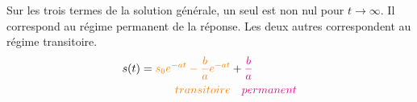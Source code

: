 Sur les trois termes de la solution générale, un seul est non                                                                             
nul pour $t\to\infty$. Il correspond au régime permanent de                                                                               
la réponse. Les deux autres correspondent au régime transitoire.                                                                          
\begin{align*}                                                                                                                            
    s(t)=\textcolor{orange}{s_0e^{-at}-\dfrac{b}{a}e^{-at}}&+\textcolor{magenta}{\dfrac{b}{a}}\\                                          
    \textcolor{orange}{transitoire} &\quad\textcolor{magenta}{permanent}                                                                  
\end{align*}                                                                                                                              











































































































